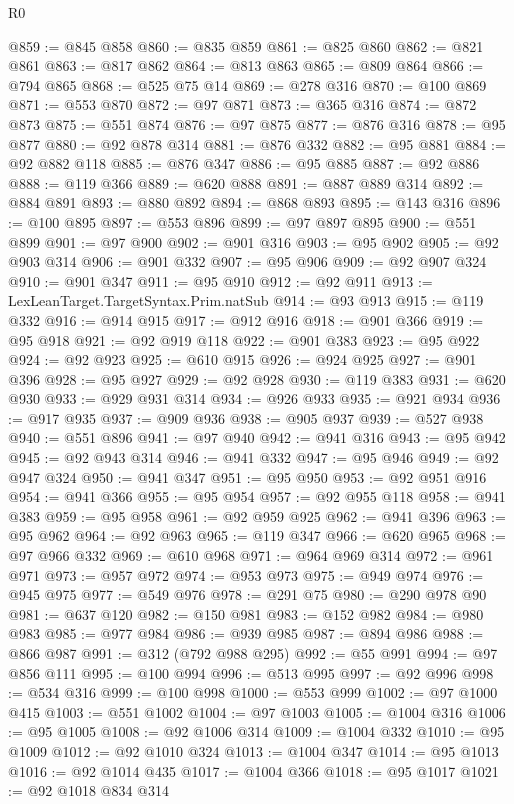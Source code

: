 \begin{lexlean}{R0}
\begin{coremodule}
@859 := @845 @858
@860 := @835 @859
@861 := @825 @860
@862 := @821 @861
@863 := @817 @862
@864 := @813 @863
@865 := @809 @864
@866 := @794 @865
@868 := @525 @75 @14
@869 := @278 @316
@870 := @100 @869
@871 := @553 @870
@872 := @97 @871
@873 := @365 @316
@874 := @872 @873
@875 := @551 @874
@876 := @97 @875
@877 := @876 @316
@878 := @95 @877
@880 := @92 @878 @314
@881 := @876 @332
@882 := @95 @881
@884 := @92 @882 @118
@885 := @876 @347
@886 := @95 @885
@887 := @92 @886
@888 := @119 @366
@889 := @620 @888
@891 := @887 @889 @314
@892 := @884 @891
@893 := @880 @892
@894 := @868 @893
@895 := @143 @316
@896 := @100 @895
@897 := @553 @896
@899 := @97 @897 @895
@900 := @551 @899
@901 := @97 @900
@902 := @901 @316
@903 := @95 @902
@905 := @92 @903 @314
@906 := @901 @332
@907 := @95 @906
@909 := @92 @907 @324
@910 := @901 @347
@911 := @95 @910
@912 := @92 @911
@913 := LexLeanTarget.TargetSyntax.Prim.natSub
@914 := @93 @913
@915 := @119 @332
@916 := @914 @915
@917 := @912 @916
@918 := @901 @366
@919 := @95 @918
@921 := @92 @919 @118
@922 := @901 @383
@923 := @95 @922
@924 := @92 @923
@925 := @610 @915
@926 := @924 @925
@927 := @901 @396
@928 := @95 @927
@929 := @92 @928
@930 := @119 @383
@931 := @620 @930
@933 := @929 @931 @314
@934 := @926 @933
@935 := @921 @934
@936 := @917 @935
@937 := @909 @936
@938 := @905 @937
@939 := @527 @938
@940 := @551 @896
@941 := @97 @940
@942 := @941 @316
@943 := @95 @942
@945 := @92 @943 @314
@946 := @941 @332
@947 := @95 @946
@949 := @92 @947 @324
@950 := @941 @347
@951 := @95 @950
@953 := @92 @951 @916
@954 := @941 @366
@955 := @95 @954
@957 := @92 @955 @118
@958 := @941 @383
@959 := @95 @958
@961 := @92 @959 @925
@962 := @941 @396
@963 := @95 @962
@964 := @92 @963
@965 := @119 @347
@966 := @620 @965
@968 := @97 @966 @332
@969 := @610 @968
@971 := @964 @969 @314
@972 := @961 @971
@973 := @957 @972
@974 := @953 @973
@975 := @949 @974
@976 := @945 @975
@977 := @549 @976
@978 := @291 @75
@980 := @290 @978 @90
@981 := @637 @120
@982 := @150 @981
@983 := @152 @982
@984 := @980 @983
@985 := @977 @984
@986 := @939 @985
@987 := @894 @986
@988 := @866 @987
@991 := @312 (@792 @988 @295)
@992 := @55 @991
@994 := @97 @856 @111
@995 := @100 @994
@996 := @513 @995
@997 := @92 @996
@998 := @534 @316
@999 := @100 @998
@1000 := @553 @999
@1002 := @97 @1000 @415
@1003 := @551 @1002
@1004 := @97 @1003
@1005 := @1004 @316
@1006 := @95 @1005
@1008 := @92 @1006 @314
@1009 := @1004 @332
@1010 := @95 @1009
@1012 := @92 @1010 @324
@1013 := @1004 @347
@1014 := @95 @1013
@1016 := @92 @1014 @435
@1017 := @1004 @366
@1018 := @95 @1017
@1021 := @92 @1018 @834 @314

\end{coremodule}
\end{lexlean}
